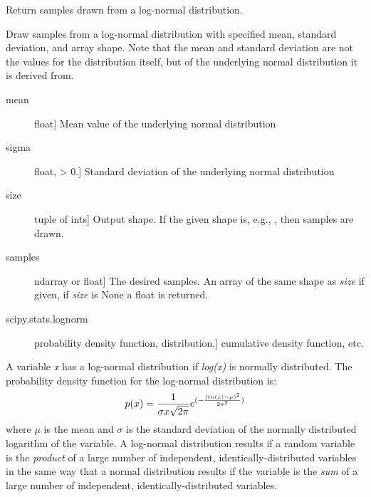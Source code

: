 \documentclass[letterpaper,10pt,english]{sphinxmanual}
\begin{document}
\begin{fulllineitems}
\label{pygeomod:pygeomod.geomodeller_xml_obj.lognormal}
Return samples drawn from a log-normal distribution.

Draw samples from a log-normal distribution with specified mean,
standard deviation, and array shape.  Note that the mean and standard
deviation are not the values for the distribution itself, but of the
underlying normal distribution it is derived from.
\begin{description}
\item[{mean}] \leavevmode{[}float{]}
Mean value of the underlying normal distribution

\item[{sigma}] \leavevmode{[}float, \textgreater{} 0.{]}
Standard deviation of the underlying normal distribution

\item[{size}] \leavevmode{[}tuple of ints{]}
Output shape.  If the given shape is, e.g., , then
 samples are drawn.

\end{description}
\begin{description}
\item[{samples}] \leavevmode{[}ndarray or float{]}
The desired samples. An array of the same shape as \emph{size} if given,
if \emph{size} is None a float is returned.

\end{description}
\begin{description}
\item[{scipy.stats.lognorm}] \leavevmode{[}probability density function, distribution,{]}
cumulative density function, etc.

\end{description}

A variable \emph{x} has a log-normal distribution if \emph{log(x)} is normally
distributed.  The probability density function for the log-normal
distribution is:
\begin{gather}
\begin{split}p(x) = \frac{1}{\sigma x \sqrt{2\pi}}
e^{(-\frac{(ln(x)-\mu)^2}{2\sigma^2})}\end{split}\notag
\end{gather}
where \(\mu\) is the mean and \(\sigma\) is the standard
deviation of the normally distributed logarithm of the variable.
A log-normal distribution results if a random variable is the \emph{product}
of a large number of independent, identically-distributed variables in
the same way that a normal distribution results if the variable is the
\emph{sum} of a large number of independent, identically-distributed
variables.


\end{fulllineitems}
\end{document}
